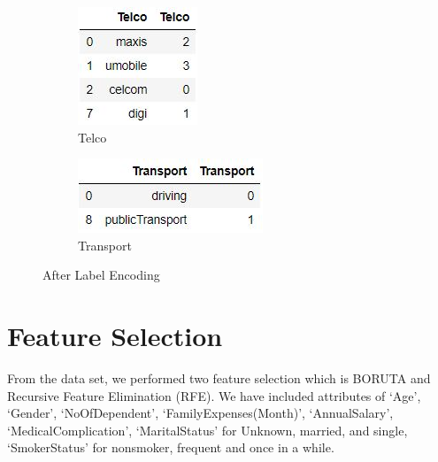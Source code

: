 \documentclass[11pt]{article}
\begin{document}
\begin{figure}[H]
\centering
\begin{subfigure}{.5\textwidth}
  \centering
  \includegraphics[width=.5\linewidth]{LabelEncodingTelco}
  \caption{Telco}
  \label{fig:LabelEncodingAddress}
\end{subfigure}%
\begin{subfigure}{.5\textwidth}
  \centering
  \includegraphics[width=.8\linewidth]{LabelEncodingTransport}
  \caption{Transport}
  \label{fig:LabelEncodingEdu}
\end{subfigure}
\caption{After Label Encoding}
\label{fig:test}

\end{figure}

\section{Feature Selection}
\hspace{0.5cm}From the data set, we performed two feature selection which is BORUTA and Recursive Feature Elimination (RFE). We have included attributes of `Age', `Gender', `NoOfDependent', `FamilyExpenses(Month)', `AnnualSalary', `MedicalComplication', `MaritalStatus' for Unknown, married, and single, `SmokerStatus' for nonsmoker, frequent and once in a while.\vspace{0.3cm}
\end{document}
